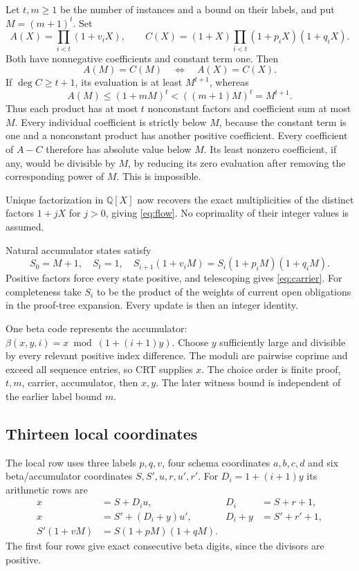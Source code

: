 Let $t,m\ge1$ be the number of instances and a
bound on their labels, and put $M=(m+1)^t$.
Set
\[
 A(X)=\prod_{i<t}(1+v_iX),\qquad
 C(X)=(1+X)\prod_{i<t}(1+p_iX)(1+q_iX).
\]
Both have nonnegative coefficients and constant
term one. Then
\begin{equation}
 A(M)=C(M)\quad\Longleftrightarrow\quad A(X)=C(X).
\label{eq:carrier}
\end{equation}
If $\deg C\ge t+1$, its evaluation is at least
$M^{t+1}$, whereas
\[
 A(M)\le(1+mM)^t<((m+1)M)^t=M^{t+1}.
\]
Thus each product has at most $t$ nonconstant
factors and coefficient sum at most $M$.
Every individual coefficient is strictly below
$M$, because the constant term is one and
a nonconstant product has another positive
coefficient. Every coefficient of $A-C$
therefore has absolute value below $M$.
Its least nonzero coefficient, if any, would
be divisible by $M$, by reducing its zero
evaluation after removing the corresponding
power of $M$. This is impossible.

Unique factorization in $\mathbb Q[X]$ now
recovers the exact multiplicities of the
distinct factors $1+jX$ for $j>0$, giving
\eqref{eq:flow}. No coprimality of their
integer values is assumed.

Natural accumulator states satisfy
\begin{equation}
 S_0=M+1,\quad S_t=1,\quad
 S_{i+1}(1+v_iM)=S_i(1+p_iM)(1+q_iM).
\label{eq:accumulator}
\end{equation}
Positive factors force every state positive,
and telescoping gives \eqref{eq:carrier}.
For completeness take $S_i$ to be the product
of the weights of current open obligations
in the proof-tree expansion. Every update
is then an integer identity.

One beta code represents the accumulator:
$\beta(x,y,i)=x\bmod(1+(i+1)y)$.
Choose $y$ sufficiently large and divisible
by every relevant positive index difference.
The moduli are pairwise coprime and exceed
all sequence entries, so CRT supplies $x$.
The choice order is finite proof, $t,m$,
carrier, accumulator, then $x,y$.
The later witness bound is independent of
the earlier label bound $m$.

\subsection{Thirteen local coordinates}

The local row uses three labels $p,q,v$,
four schema coordinates $a,b,c,d$ and six
beta/accumulator coordinates $S,S',u,r,u',r'$.
For $D_i=1+(i+1)y$ its arithmetic rows are
\begin{align*}
 x&=S+D_i u,&D_i&=S+r+1,\\
 x&=S'+(D_i+y)u',&D_i+y&=S'+r'+1,\\
 S'(1+vM)&=S(1+pM)(1+qM).
\end{align*}
The first four rows give exact consecutive
beta digits, since the divisors are positive.

